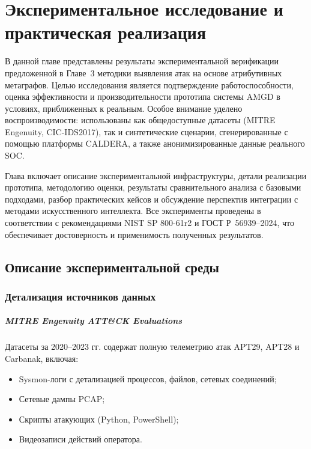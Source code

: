 
\chapter{Экспериментальное исследование и практическая реализация}\label{ch:ch4}

В данной главе представлены результаты экспериментальной верификации предложенной в Главе~3 методики выявления атак на основе атрибутивных метаграфов. Целью исследования является подтверждение работоспособности, оценка эффективности и производительности прототипа системы AMGD в условиях, приближенных к реальным. Особое внимание уделено воспроизводимости: использованы как общедоступные датасеты (MITRE Engenuity, CIC-IDS2017), так и синтетические сценарии, сгенерированные с помощью платформы CALDERA, а также анонимизированные данные реального SOC.

Глава включает описание экспериментальной инфраструктуры, детали реализации прототипа, методологию оценки, результаты сравнительного анализа с базовыми подходами, разбор практических кейсов и обсуждение перспектив интеграции с методами искусственного интеллекта. Все эксперименты проведены в соответствии с рекомендациями NIST SP 800-61r2 и ГОСТ Р~56939–2024, что обеспечивает достоверность и применимость полученных результатов.

\section{Описание экспериментальной среды}\label{sec:ch4/sect1}

\subsection{Детализация источников данных}

\paragraph{MITRE Engenuity ATT\&CK Evaluations}
Датасеты за 2020–2023 гг. содержат полную телеметрию атак APT29, APT28 и Carbanak, включая:

\begin{itemize}
    \item Sysmon-логи с детализацией процессов, файлов, сетевых соединений;
    \item Сетевые дампы PCAP;
    \item Скрипты атакующих (Python, PowerShell);
    \item Видеозаписи действий оператора.
\end{itemize}


